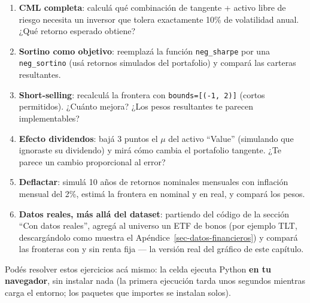 \documentclass[
  spanish,
  letterpaper,
  DIV=11,
  numbers=noendperiod]{scrreprt}
\providecommand{\tightlist}{%
  \setlength{\itemsep}{0pt}\setlength{\parskip}{0pt}}
\begin{document}
\begin{tcolorbox}[enhanced jigsaw, bottomrule=.15mm, colback=white, opacitybacktitle=0.6, arc=.35mm, toprule=.15mm, opacityback=0, breakable, titlerule=0mm, left=2mm, coltitle=black, colbacktitle=quarto-callout-important-color!10!white, colframe=quarto-callout-important-color-frame, leftrule=.75mm, toptitle=1mm, bottomtitle=1mm, title=\textcolor{quarto-callout-important-color}{\faExclamation}\hspace{0.5em}{Ejercicios}, rightrule=.15mm]

\begin{enumerate}
\def\labelenumi{\arabic{enumi}.}
\tightlist
\item
  \textbf{CML completa}: calculá qué combinación de tangente + activo
  libre de riesgo necesita un inversor que tolera exactamente 10\% de
  volatilidad anual. ¿Qué retorno esperado obtiene?
\item
  \textbf{Sortino como objetivo}: reemplazá la función
  \texttt{neg\_sharpe} por una \texttt{neg\_sortino} (usá retornos
  simulados del portafolio) y compará las carteras resultantes.
\item
  \textbf{Short-selling}: recalculá la frontera con
  \texttt{bounds={[}(-1,\ 2){]}} (cortos permitidos). ¿Cuánto mejora?
  ¿Los pesos resultantes te parecen implementables?
\item
  \textbf{Efecto dividendos}: bajá 3 puntos el \(\mu\) del activo
  ``Value'' (simulando que ignoraste su dividendo) y mirá cómo cambia el
  portafolio tangente. ¿Te parece un cambio proporcional al error?
\item
  \textbf{Deflactar}: simulá 10 años de retornos nominales mensuales con
  inflación mensual del 2\%, estimá la frontera en nominal y en real, y
  compará los pesos.
\item
  \textbf{Datos reales, más allá del dataset}: partiendo del código de
  la sección ``Con datos reales'', agregá al universo un ETF de bonos
  (por ejemplo TLT, descargándolo como muestra el
  Apéndice~\ref{sec-datos-financieros}) y compará las fronteras con y
  sin renta fija --- la versión real del gráfico de este capítulo.
\end{enumerate}

\end{tcolorbox}

Podés resolver estos ejercicios acá mismo: la celda ejecuta Python
\textbf{en tu navegador}, sin instalar nada (la primera ejecución tarda
unos segundos mientras carga el entorno; los paquetes que importes se
instalan solos).
\end{document}
